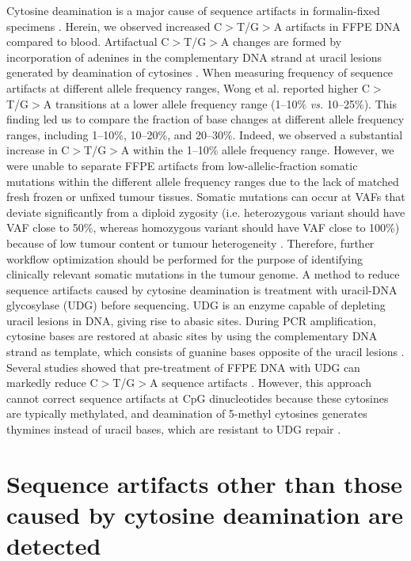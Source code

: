 Cytosine deamination is a major cause of sequence artifacts in formalin-fixed specimens \cite{Wong2014, Do2012, Oh2015, Spencer2013, Do2013, Kim2017, Chen2014}. Herein, we observed increased C$>$T/G$>$A artifacts in FFPE DNA compared to blood. Artifactual C$>$T/G$>$A changes are formed by incorporation of adenines in the complementary DNA strand at uracil lesions generated by deamination of cytosines \cite{Do2015a}. When measuring frequency of sequence artifacts at different allele frequency ranges, Wong et al. \cite{Wong2014} reported higher C$>$T/G$>$A transitions at a lower allele frequency range (1--10\% \textit{vs.} 10--25\%). This finding led us to compare the fraction of base changes at different allele frequency ranges, including 1--10\%, 10--20\%, and 20--30\%. Indeed, we observed a substantial increase in C$>$T/G$>$A within the 1--10\% allele frequency range. However, we were unable to separate FFPE artifacts from low-allelic-fraction somatic mutations within the different allele frequency ranges due to the lack of matched fresh frozen or unfixed tumour tissues. Somatic mutations can occur at VAFs that deviate significantly from a diploid zygosity (i.e. heterozygous variant should have VAF close to 50\%, whereas homozygous variant should have VAF close to 100\%) because of low tumour content or tumour heterogeneity \cite{Kim2017a, Xu2017, Carrot-Zhang2016, Tian2015, Cai2016}. Therefore, further workflow optimization should be performed for the purpose of identifying clinically relevant somatic mutations in the tumour genome. A method to reduce sequence artifacts caused by cytosine deamination is treatment with uracil-DNA glycosylase (UDG) before sequencing. UDG is an enzyme capable of depleting uracil lesions in DNA, giving rise to abasic sites. During PCR amplification, cytosine bases are restored at abasic sites by using the complementary DNA strand as template, which consists of guanine bases opposite of the uracil lesions \cite{Do2015a}. Several studies showed that pre-treatment of FFPE DNA with UDG can markedly reduce C$>$T/G$>$A sequence artifacts \cite{Do2013, Kim2017, Do2012}. However, this approach cannot correct sequence artifacts at CpG dinucleotides because these cytosines are typically methylated, and deamination of 5-methyl cytosines generates thymines instead of uracil bases, which are resistant to UDG repair \cite{Do2013}.

\section{Sequence artifacts other than those caused by cytosine deamination are detected}
\label{sec:Sequenceartifactsotherthanthosecausedbycytosinedeaminationaredetected}

